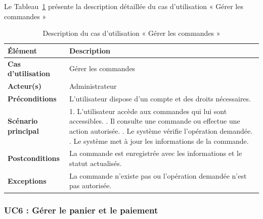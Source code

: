Le Tableau~\ref{tab:uc5_sprint2} présente la description détaillée du cas d’utilisation « Gérer les commandes »
\begin{longtable}{|>{\raggedright\arraybackslash}p{4cm}|>{\raggedright\arraybackslash}p{10.5cm}|}

\caption{Description du cas d’utilisation « Gérer les commandes »}
\label{tab:uc5_sprint2}\\

\hline
\textbf{Élément} & \textbf{Description} \\
\hline

\textbf{Cas d’utilisation} & Gérer les commandes \\
\hline

\textbf{Acteur(s)} & Administrateur \\
\hline

\textbf{Préconditions} &
L’utilisateur dispose d’un compte et des droits nécessaires. \\
\hline

\textbf{Scénario principal} &

1. L’utilisateur accède aux commandes qui lui sont accessibles. \newline
2. Il consulte une commande ou effectue une action autorisée. \newline
3. Le système vérifie l’opération demandée. \newline
4. Le système met à jour les informations de la commande. \\
   \hline

\textbf{Postconditions} &
La commande est enregistrée avec les informations et le statut actualisés. \\
\hline

\textbf{Exceptions} &
La commande n’existe pas ou l’opération demandée n’est pas autorisée. \\
\hline

\end{longtable}


\vspace{0.3cm}
\subsubsection{UC6 : Gérer le panier et le paiement}

